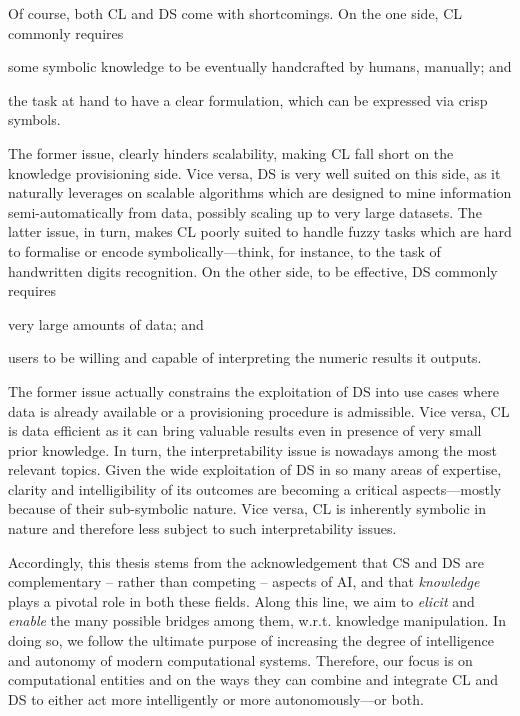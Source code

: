 \documentclass[12pt,a4paper,openright,twoside]{book}
\begin{document}
Of course, both CL and DS come with shortcomings.
%
On the one side, CL commonly requires
%
\begin{inlinelist}
    \item some symbolic knowledge to be eventually handcrafted by humans, manually; and
    \item the task at hand to have a clear formulation, which can be expressed via crisp symbols.
\end{inlinelist}
%
The former issue, clearly hinders scalability, making CL fall short on the knowledge provisioning side.
%
Vice versa, DS is very well suited on this side, as it naturally leverages on scalable algorithms which are designed to mine information semi-automatically from data, possibly scaling up to very large datasets.
%
The latter issue, in turn, makes CL poorly suited to handle fuzzy tasks which are hard to formalise or encode symbolically---think, for instance, to the task of handwritten digits recognition.
%
On the other side, to be effective, DS commonly requires
%
\begin{inlinelist}
    \item very large amounts of data; and
    \item users to be willing and capable of interpreting the numeric results it outputs.
\end{inlinelist}
%
The former issue actually constrains the exploitation of DS into use cases where data is already available or a provisioning procedure is admissible.
%
Vice versa, CL is data efficient as it can bring valuable results even in presence of very small prior knowledge.
%
In turn, the interpretability issue is nowadays among the most relevant topics.
%
Given the wide exploitation of DS in so many areas of expertise, clarity and intelligibility of its outcomes are becoming a critical aspects---mostly because of their sub-symbolic nature.
%
Vice versa, CL is inherently symbolic in nature and therefore less subject to such interpretability issues.

Accordingly, this thesis stems from the acknowledgement that CS and DS are complementary -- rather than competing -- aspects of AI, and that \emph{knowledge} plays a pivotal role in both these fields.
%
Along this line, we aim to \emph{elicit} and \emph{enable} the many possible bridges among them, w.r.t. knowledge manipulation.
%
In doing so, we follow the ultimate purpose of increasing the degree of intelligence and autonomy of modern computational systems.
%
Therefore, our focus is on computational entities and on the ways they can combine and integrate CL and DS to either act more intelligently or more autonomously---or both.
\end{document}
